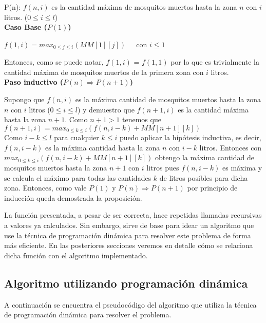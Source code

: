 \documentclass[a4paper,11pt] {article}
\begin{document}
P(n): $f(n, i)$ es la cantidad m\'axima de mosquitos muertos hasta la zona $n$ con $i$ litros. ($0 \leq i \leq l$) \\

\textbf{Caso Base ($P(1)$)}

$f(1,i) = max_{0 \leq j \leq i} (MM[1][j]) \;\;\;\; $ con $i \leq 1$

Entonces, como se puede notar, $f(1,i)$ = $f (1,1)$ por lo que es trivialmente la cantidad m\'axima de mosquitos muertos de la primera zona con $i$ litros. \\

\textbf{Paso inductivo ($P(n) \Rightarrow P(n+1)$)}

Supongo que $f(n,i)$ es la m\'axima cantidad de mosquitos muertos hasta la zona $n$ con $i$ litros ($0 \leq i \leq l$) y demuestro que $f(n+1,i)$ es la cantidad m\'axima hasta la zona $n+1$.
Como $n+1 > 1$ tenemos que \\

$f(n+1,i) = max_{0 \leq k \leq i} (f(n, i-k) + MM[n+1][k])$ \\

Como $i - k \leq l$ para cualquier $k \leq i$ puedo aplicar la hip\'otesis inductiva, es decir, $f(n,i-k)$ es la m\'axima cantidad hasta la zona $n$ con $i-k$ litros. Entonces con $max_{0 \leq k \leq i} (f(n, i-k) + MM[n+1][k])$ obtengo la m\'axima cantidad de mosquitos muertos hasta la zona $n+1$ con $i$ litros pues $f(n,i-k)$ es m\'axima y se calcula el m\'aximo para todas las cantidades $k$ de litros posibles para dicha zona. Entonces, como vale $P(1)$ y $P(n) \Rightarrow P(n+1)$ por principio de inducci\'on queda demostrada la proposici\'on.

La funci\'on presentada, a pesar de ser correcta, hace repetidas llamadas recursivas a valores ya calculados. Sin embargo, sirve de base para idear un algoritmo que use la t\'ecnica de programaci\'on din\'amica para resolver este problema de forma m\'as eficiente. En las posteriores secciones veremos en detalle c\'omo se relaciona dicha funci\'on con el algoritmo implementado.

\subsection*{Algoritmo utilizando programaci\'on din\'amica}

A continuaci\'on se encuentra el pseudoc\'odigo del algoritmo que utiliza la t\'ecnica de programaci\'on din\'amica para resolver el problema.
\end{document}
